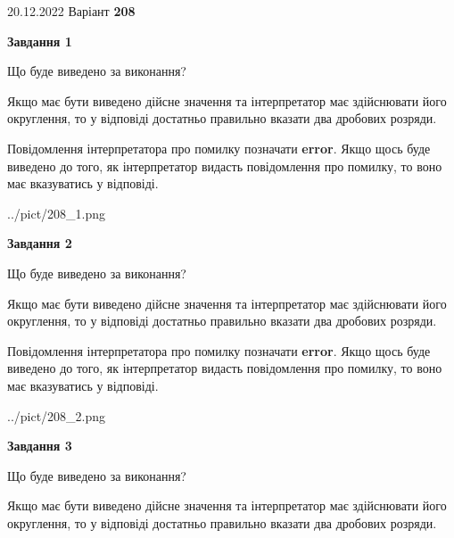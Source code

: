 \documentclass[12pt, ukrainian]{article}
\begin{document}
{20.12.2022 Варіант \No \textbf { 208 }\par}
{
\begin {Large}

{\begin {center}\textbf{Завдання 1}\end {center}}\par
Що буде виведено за виконання? \par

Якщо має бути виведено дійсне значення та інтерпретатор має здійснювати його округлення, 
то у відповіді достатньо правильно вказати два дробових розряди.

Повідомлення інтерпретатора про помилку позначати \textbf{error}.
Якщо щось буде виведено до того, як інтерпретатор видасть повідомлення про помилку, 
то воно має вказуватись у відповіді. \par

\begin{center}
	{../pict/208_1.png}
\end{center}
\newpage

{\begin {center}\textbf{Завдання 2}\end {center}}\par
Що буде виведено за виконання? \par

Якщо має бути виведено дійсне значення та інтерпретатор має здійснювати його округлення, 
то у відповіді достатньо правильно вказати два дробових розряди.

Повідомлення інтерпретатора про помилку позначати \textbf{error}.
Якщо щось буде виведено до того, як інтерпретатор видасть повідомлення про помилку, 
то воно має вказуватись у відповіді. \par

\begin{center}
	{../pict/208_2.png}
\end{center}
\newpage

{\begin {center}\textbf{Завдання 3}\end {center}}\par
Що буде виведено за виконання? \par

Якщо має бути виведено дійсне значення та інтерпретатор має здійснювати його округлення, 
то у відповіді достатньо правильно вказати два дробових розряди.


\end{Large}}
\end{document}
